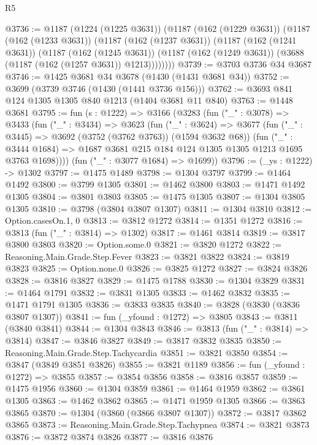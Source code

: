 \begin{lexlean}{R5}
\begin{coremodule}
@3736 := @1187
    (@1224 (@1225 @3631))
    (@1187
      (@162 (@1229 @3631))
      (@1187
        (@162 (@1233 @3631))
        (@1187
          (@162 (@1237 @3631))
          (@1187
            (@162 (@1241 @3631))
            (@1187
              (@162 (@1245 @3631))
              (@1187 (@162 (@1249 @3631)) (@3688 (@1187 (@162 (@1257 @3631)) @1213))))))))
@3739 := @3703 @3736 @34 @3687
@3746 := @1425 @3681 @34 @3678 (@1430 (@1431 @3681 @34))
@3752 := @3699 (@3739 @3746 (@1430 (@1441 @3736 @156)))
@3762 := @3693 @841 @124 @1305 @1305 @840 @1213 (@1404 @3681 @11 @840)
@3763 := @1448 @3681
@3795 := fun (s : @1222) =>
  @3166
    (@3283
      (fun ("_" : @3078) =>
      @3433
        (fun ("_" : @3434) =>
        @3623
          (fun ("_" : @3624) =>
          @3677
            (fun ("_" : @3445) => @3692 (@3752 (@3762 @3763)) (@1594 @3632 @68))
            (fun ("_" : @3444 @1684) =>
            @1687 @3681 @215 @184 @124 @1305 @1305 @1213 @1695 @3763 @1698))))
      (fun ("_" : @3077 @1684) => @1699))
@3796 := (_ys : @1222) -> @1302
@3797 := @1475 @1489
@3798 := @1304 @3797
@3799 := @1464 @1492
@3800 := @3799 @1305
@3801 := @1462 @3800
@3803 := @1471 @1492 @1305
@3804 := @3801 @3803
@3805 := @1475 @1305
@3807 := @1304 @3805 @1305
@3810 := @3798 (@3804 @3807 @1307)
@3811 := @1304 @3810
@3812 := Option.casesOn.{1, 0}
@3813 := @3812 @1272
@3814 := @1351 @1272
@3816 := @3813 (fun ("_" : @3814) => @1302)
@3817 := @1461 @3814
@3819 := @3817 @3800 @3803
@3820 := Option.some.{0}
@3821 := @3820 @1272
@3822 := Reasoning.Main.Grade.Step.Fever
@3823 := @3821 @3822
@3824 := @3819 @3823
@3825 := Option.none.{0}
@3826 := @3825 @1272
@3827 := @3824 @3826
@3828 := @3816 @3827
@3829 := @1475 @1788
@3830 := @1304 @3829
@3831 := @1464 @1791
@3832 := @3831 @1305
@3833 := @1462 @3832
@3835 := @1471 @1791 @1305
@3836 := @3833 @3835
@3840 := @3828 (@3830 (@3836 @3807 @1307))
@3841 := fun (_yfound : @1272) => @3805
@3843 := @3811 (@3840 @3841)
@3844 := @1304 @3843
@3846 := @3813 (fun ("_" : @3814) => @3814)
@3847 := @3846 @3827
@3849 := @3817 @3832 @3835
@3850 := Reasoning.Main.Grade.Step.Tachycardia
@3851 := @3821 @3850
@3854 := @3847 (@3849 @3851 @3826)
@3855 := @3821 @1189
@3856 := fun (_yfound : @1272) => @3855
@3857 := @3854 @3856
@3858 := @3816 @3857
@3859 := @1475 @1956
@3860 := @1304 @3859
@3861 := @1464 @1959
@3862 := @3861 @1305
@3863 := @1462 @3862
@3865 := @1471 @1959 @1305
@3866 := @3863 @3865
@3870 := @1304 (@3860 (@3866 @3807 @1307))
@3872 := @3817 @3862 @3865
@3873 := Reasoning.Main.Grade.Step.Tachypnea
@3874 := @3821 @3873
@3876 := @3872 @3874 @3826
@3877 := @3816 @3876

\end{coremodule}
\end{lexlean}
